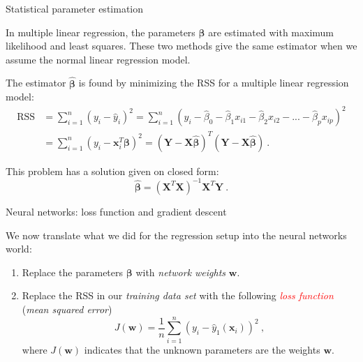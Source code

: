 \documentclass[10pt,ignorenonframetext,]{beamer}
\begin{document}
\begin{frame}

\begin{block}{Statistical parameter estimation}

\vspace{2mm}

In multiple linear regression, the parameters \(\boldsymbol\beta\) are
estimated with maximum likelihood and least squares. These two methods
give the same estimator when we assume the normal linear regression
model.

The estimator \(\hat{\boldsymbol \beta}\) is found by minimizing the RSS
for a multiple linear regression model:
\[\begin{aligned} \text{RSS} &=\sum_{i=1}^n (y_i - \hat y_i)^2 = \sum_{i=1}^n (y_i - \hat \beta_0 - \hat \beta_1 x_{i1} - \hat \beta_2 x_{i2} -...-\hat \beta_p x_{ip} )^2 \\
&= \sum_{i=1}^n (y_i-{\boldsymbol x}_i^T \boldsymbol \beta)^2=({\boldsymbol Y}-{\boldsymbol X}\hat{\boldsymbol{\beta}})^T({\boldsymbol Y}-{\boldsymbol X}\hat{\boldsymbol{\beta}}) \ .\end{aligned}\]

This problem has a solution given on closed form:
\[ \hat{\boldsymbol\beta}=({\boldsymbol X}^T{\boldsymbol X})^{-1} {\boldsymbol X}^T {\boldsymbol Y} \ .\]

\end{block}

\end{frame}

\begin{frame}

\begin{block}{Neural networks: loss function and gradient descent}

\vspace{4mm}

We now translate what we did for the regression setup into the neural
networks world: \vspace{2mm}

\begin{enumerate}
\def\labelenumi{\arabic{enumi}.}
\item
  Replace the parameters \(\boldsymbol\beta\) with \emph{network
  weights} \(\boldsymbol w\).
\item
  Replace the RSS in our \emph{training data set} with the following
  \emph{\textcolor{red}{loss function}} (\emph{mean squared error})
  \[ J({\boldsymbol w})=\frac{1}{n}\sum_{i=1}^n (y_i-{\hat{y}_1({\boldsymbol x}_i)})^2 \ ,\]
  where \(J({\boldsymbol w})\) indicates that the unknown parameters are
  the weights \({\boldsymbol w}\).
\end{enumerate}

\end{block}

\end{frame}
\end{document}
